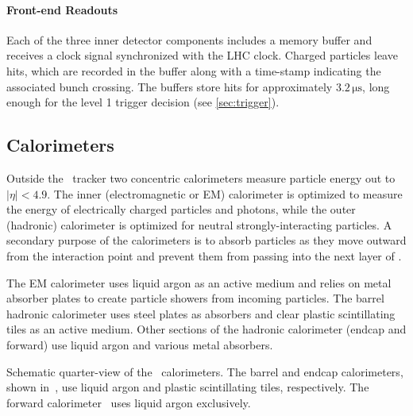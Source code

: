 \paragraph{Front-end Readouts} Each of the three inner detector components includes a memory buffer and receives a clock signal synchronized with the LHC clock.
Charged particles leave hits, which are recorded in the buffer along with a time-stamp indicating the associated bunch crossing.
The buffers store hits for approximately $3.2\,\mathrm{\mu s}$, long enough for the level 1 trigger decision (see \cref{sec:trigger}).



\subsection{Calorimeters}
Outside the \atlas\ tracker two concentric calorimeters measure particle energy out to $|\eta| < 4.9$.
The inner (electromagnetic or EM) calorimeter is optimized to measure the energy of electrically charged particles and photons, while the outer (hadronic) calorimeter is optimized for neutral strongly-interacting particles.
A secondary purpose of the calorimeters is to absorb particles as they move outward from the interaction point and prevent them from passing into the next layer of \atlas.

The EM calorimeter uses liquid argon as an active medium and relies on metal absorber plates to create particle showers from incoming particles.
The barrel hadronic calorimeter uses steel plates as absorbers and clear plastic scintillating tiles as an active medium.
Other sections of the hadronic calorimeter (endcap and forward) use liquid argon and various metal absorbers.

\begin{cfig}
  \caption[Atlas calorimeter quarter-view]{Schematic quarter-view of the \atlas\ calorimeters. The barrel and endcap calorimeters, shown in~, use liquid argon and plastic scintillating tiles, respectively. The forward calorimeter~ uses liquid argon exclusively.}
  \label{fig:atlas-calos-quarter}
\end{cfig}

